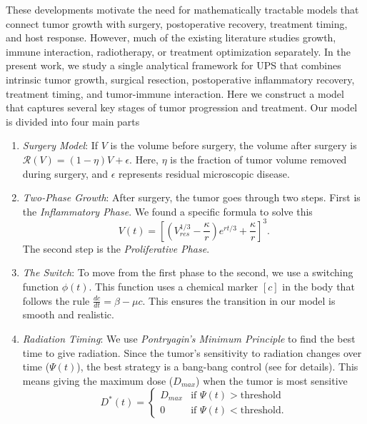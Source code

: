 \documentclass[11pt, reqno]{amsart}
\numberwithin{equation}{section}
\theoremstyle{definition}
\begin{document}
These developments motivate the need for mathematically tractable models that connect tumor growth with surgery, postoperative recovery, treatment timing, and host response. However, much of the existing literature studies growth, immune interaction, radiotherapy, or treatment optimization separately. In the present work, we study a single analytical framework for UPS that combines intrinsic tumor growth, surgical resection, postoperative inflammatory recovery, treatment timing, and tumor-immune interaction. Here we construct a model that captures several key stages of tumor progression and treatment. Our model is divided into four main parts
\begin{enumerate}
    \item[(i)] \textit{Surgery Model}: If $V$ is the volume before surgery, the volume after surgery is $\mathcal{R}(V) = (1-\eta)V + \epsilon$. Here, $\eta$ is the fraction of tumor volume removed during surgery, and $\epsilon$ represents residual microscopic disease.
    
    \item[(ii)] \textit{Two-Phase Growth}: After surgery, the tumor goes through two steps. First is the \textit{Inflammatory Phase}. We found a specific formula to solve this
    \[
    V(t) = \left[\left(V_{res}^{1/3} - \frac{\kappa}{r}\right)e^{rt/3} + \frac{\kappa}{r}\right]^3.
    \]
    The second step is the \textit{Proliferative Phase}. 
    
    \item[(iii)] \textit{The Switch}: To move from the first phase to the second, we use a switching function $\phi(t)$. This function uses a chemical marker $[c]$ in the body that follows the rule $\frac{dc}{dt} = \beta - \mu c$. This ensures the transition in our model is smooth and realistic.
    
    \item[(iv)] \textit{Radiation Timing}: We use \textit{Pontryagin’s Minimum Principle} to find the best time to give radiation. Since the tumor's sensitivity to radiation changes over time ($\Psi(t)$), the best strategy is a bang-bang control (see \cite{Hall2018} for details). This means giving the maximum dose ($D_{max}$) when the tumor is most sensitive
    \[
    D^*(t) = \begin{cases} D_{max} & \text{if } \Psi(t) > \text{threshold} \\ 0 & \text{if } \Psi(t) < \text{threshold} .\end{cases}
    \]
\end{enumerate}
\end{document}
